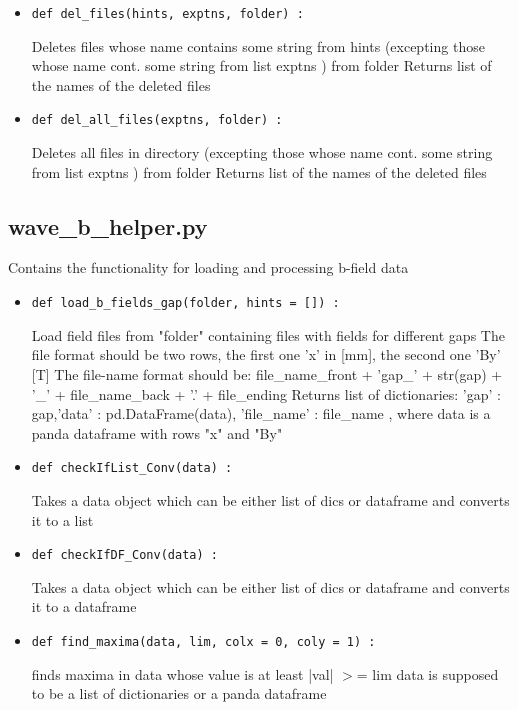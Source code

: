 \documentclass[
12pt,%
a4paper,  %
twoside        %
]{report}
\begin{document}
\begin{landscape}
\begin{itemize}
\item \begin{verbatim}
def del_files(hints, exptns, folder) :
\end{verbatim}
Deletes files whose name contains some string from hints (excepting those whose name cont.
some string from list exptns ) from folder
Returns list of the names of the deleted files
\item \begin{verbatim}
def del_all_files(exptns, folder) :
\end{verbatim}
Deletes all files in directory (excepting those whose name cont.
some string from list exptns ) from folder
Returns list of the names of the deleted files
\end{itemize}
\subsection{wave\_b\_helper.py}
Contains the functionality for loading and processing b-field data
\begin{itemize}
\item \begin{verbatim}
def load_b_fields_gap(folder, hints = []) :
\end{verbatim}
Load field files from "folder" containing files with fields for different gaps
The file format should be two rows, the first one 'x' in [mm], the second one 'By' [T]
The file-name format should be: file\_name\_front + 'gap\_' + str(gap) + '\_' + file\_name\_back + '.' + file\_ending
Returns list of dictionaries: { 'gap' : gap,'data' : pd.DataFrame(data), 'file\_name' : file\_name }, where data is a panda dataframe with rows
"x" and "By"
\item \begin{verbatim}
def checkIfList_Conv(data) :
\end{verbatim}
Takes a data object which can be either list of dics or dataframe and converts
it to a list
\item \begin{verbatim}
def checkIfDF_Conv(data) :
\end{verbatim}
Takes a data object which can be either list of dics or dataframe and converts
it to a dataframe
\item \begin{verbatim}
def find_maxima(data, lim, colx = 0, coly = 1) :
\end{verbatim}
finds maxima in data whose value is at least |val| $>$= lim
data is supposed to be a list of dictionaries or a panda dataframe 

\end{itemize}
\end{landscape}
\end{document}
